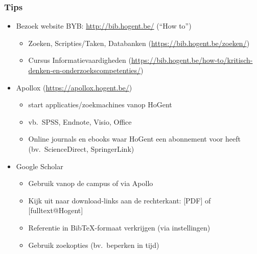 \documentclass{beamer}
\begin{document}
\begin{frame}
  \frametitle{Tips}

  \begin{itemize}
    \item<+-> Bezoek website BYB: \url{http://bib.hogent.be/} (``How to'')
      \begin{itemize}
        \item Zoeken, Scripties/Taken, Databanken (\url{https://bib.hogent.be/zoeken/})
        \item Cursus Informatievaardigheden (\url{https://bib.hogent.be/how-to/kritisch-denken-en-onderzoekscompetenties/})
      \end{itemize}
    \item<+-> Apollox (\url{https://apollox.hogent.be/})
      \begin{itemize}
        \item start applicaties/zoekmachines vanop HoGent
        \item vb.~SPSS, Endnote, Visio, Office
        \item Online journals en ebooks waar HoGent een abonnement voor heeft (bv.~ScienceDirect, SpringerLink)
      \end{itemize}
    \item<+-> Google Scholar
      \begin{itemize}
        \item Gebruik vanop de campus of via Apollo
        \item Kijk uit naar download-links aan de rechterkant: [PDF] of [fulltext@Hogent]
        \item Referentie in Bib{\TeX}-formaat verkrijgen (via instellingen)
        \item Gebruik zoekopties (bv.~beperken in tijd)
      \end{itemize}
  \end{itemize}
\end{frame}
\end{document}
